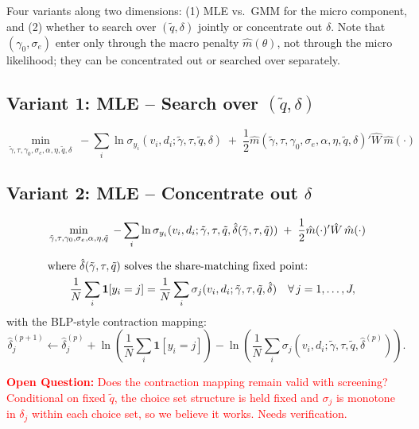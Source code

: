 \documentclass[11pt]{article}
\newcommand{\openq}[1]{\medskip\noindent\textcolor{red}{\textbf{Open Question:} #1}\medskip}
\begin{document}
Four variants along two dimensions: (1) MLE vs.\ GMM for the micro component, and (2) whether to search over $(\tilde q,\delta)$ jointly or concentrate out $\delta$. Note that $(\gamma_0,\sigma_e)$ enter only through the macro penalty $\hat m(\theta)$, not through the micro likelihood; they can be concentrated out or searched over separately.

\subsection{Variant 1: MLE -- Search over $(\tilde q,\delta)$}

\begin{equation}\label{eq:var1}
\min_{\tilde\gamma,\tau,\gamma_0,\sigma_e,\alpha,\eta,\tilde q,\delta}\;-\sum_i \ln \sigma_{y_i}(v_i,d_i;\tilde\gamma,\tau,\tilde q,\delta) \;+\; \frac{1}{2}\hat m(\tilde\gamma,\tau,\gamma_0,\sigma_e,\alpha,\eta,\tilde q,\delta)'\hat W\,\hat m(\cdot)
\end{equation}

\subsection{Variant 2: MLE -- Concentrate out $\delta$}

\begin{align}\label{eq:var2}
&\min_{\tilde\gamma,\tau,\gamma_0,\sigma_e,\alpha,\eta,\tilde q}\;-\sum_i \ln \sigma_{y_i}(v_i,d_i;\tilde\gamma,\tau,\tilde q,\hat\delta(\tilde\gamma,\tau,\tilde q)) \;+\; \frac{1}{2}\hat m(\cdot)'\hat W\,\hat m(\cdot) \notag\\[6pt]
&\text{where } \hat\delta(\tilde\gamma,\tau,\tilde q) \text{ solves the share-matching fixed point:}\notag\\
&\qquad \frac{1}{N}\sum_i \mathbf{1}[y_i=j] = \frac{1}{N}\sum_i \sigma_j(v_i,d_i;\tilde\gamma,\tau,\tilde q,\hat\delta) \quad\forall\, j=1,\ldots,J,
\end{align}
with the BLP-style contraction mapping:
\[
\hat\delta_j^{(p+1)} \leftarrow \hat\delta_j^{(p)} + \ln\!\left(\frac{1}{N}\sum_i \mathbf{1}[y_i=j]\right) - \ln\!\left(\frac{1}{N}\sum_i \sigma_j(v_i,d_i;\tilde\gamma,\tau,\tilde q,\hat\delta^{(p)})\right).
\]

\openq{Does the contraction mapping remain valid with screening? Conditional on fixed $\tilde q$, the choice set structure is held fixed and $\sigma_j$ is monotone in $\delta_j$ within each choice set, so we believe it works. Needs verification.}
\end{document}
